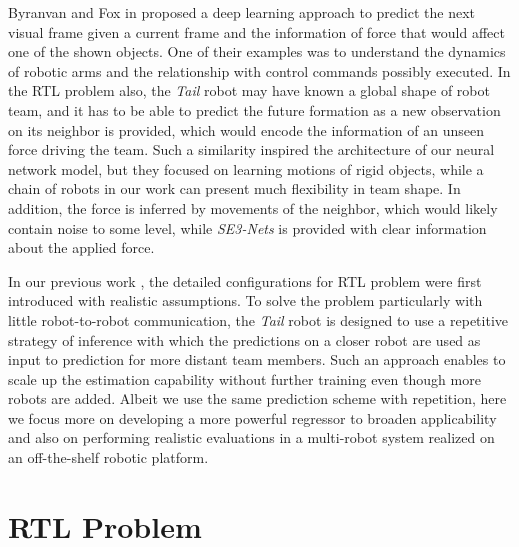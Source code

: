 \documentclass[letterpaper, 10 pt, conference]{ieeeconf}  %
\begin{document}
	Byranvan and Fox in \cite{BF17} proposed a deep learning approach 
	to predict the next visual frame given a current frame and the information 
	of force that would affect one of the shown objects. One of their examples was 
	to understand the dynamics of robotic arms and the relationship with control 
	commands possibly executed. In the RTL problem also, the \emph{Tail} robot may 
	have known 
	a global shape of robot team, and it has to be able to predict the future 
	formation as a new observation on its neighbor is provided, which would encode 
	the information of an unseen force driving the team. Such a similarity inspired 
	the architecture of our neural network model, but they focused on learning 
	motions of rigid objects, while a chain of robots in our work can present 
	much flexibility in team shape. In addition, the force is inferred by 
	movements of the neighbor, which would likely contain noise to some level, while 
	\emph{SE3-Nets} is provided with clear information about the applied force.  
	
	In our previous work \cite{CPR17}, the detailed configurations for RTL 
	problem were first introduced with realistic assumptions. 
	To solve the problem particularly with little robot-to-robot communication, 
	the \emph{Tail} robot is designed to use a repetitive strategy of inference 
	with which the predictions on a closer robot are used as input to 
	prediction for more distant team members. Such an approach enables to scale 
	up the estimation capability without further training even though more robots are 
	added. Albeit we use the same prediction scheme with repetition, here we focus 
	more on developing a more powerful regressor to broaden applicability and 
	also on performing realistic evaluations in a multi-robot system realized on 
	an off-the-shelf robotic platform. 
	
	
	\section{RTL Problem} 
	\label{sec:rtl_problem}
	
\end{document}

